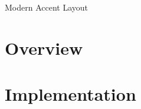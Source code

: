 \documentclass{article}
\begin{document}
{\Huge Modern Accent Layout}

\vspace{1cm}

\section*{Overview}
\lipsum[1]

\section*{Implementation}
\lipsum[2]
\end{document}
